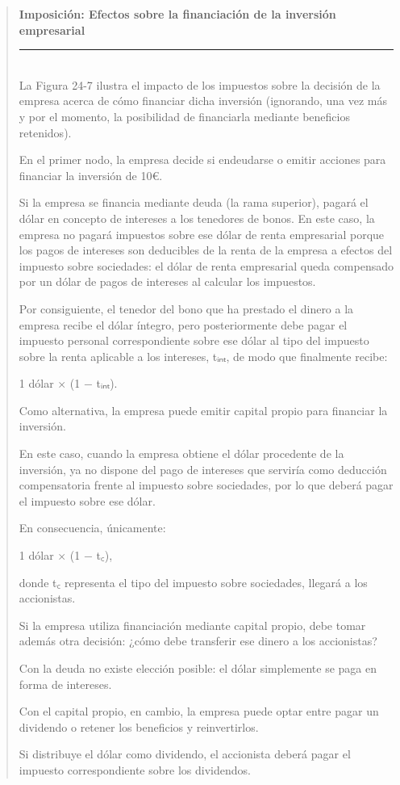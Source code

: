 \documentclass[10pt,a4paper]{article}
\newenvironment{specialblock}[1]{%
      \begin{quote} %
      \small %
      \noindent\textbf{#1}\\[-0.3em] %
      \rule{\linewidth}{0.4pt}\\[0.6em]}{
      \end{quote}}
\begin{document}
\begin{specialblock}{Imposición: Efectos sobre la financiación de la inversión empresarial}
    La Figura 24-7 ilustra el impacto de los impuestos sobre la decisión de la empresa acerca de cómo financiar dicha inversión (ignorando, una vez más y por el momento, la posibilidad de financiarla mediante beneficios retenidos).
    
    En el primer nodo, la empresa decide si endeudarse o emitir acciones para financiar la inversión de 10€.
    
    Si la empresa se financia mediante deuda (la rama superior), pagará el dólar en concepto de intereses a los tenedores de bonos. En este caso, la empresa no pagará impuestos sobre ese dólar de renta empresarial porque los pagos de intereses son deducibles de la renta de la empresa a efectos del impuesto sobre sociedades: el dólar de renta empresarial queda compensado por un dólar de pagos de intereses al calcular los impuestos.
    
    Por consiguiente, el tenedor del bono que ha prestado el dinero a la empresa recibe el dólar íntegro, pero posteriormente debe pagar el impuesto personal correspondiente sobre ese dólar al tipo del impuesto sobre la renta aplicable a los intereses, tᵢₙₜ, de modo que finalmente recibe:
    
    1 dólar × (1 − tᵢₙₜ).
    
    Como alternativa, la empresa puede emitir capital propio para financiar la inversión.
    
    En este caso, cuando la empresa obtiene el dólar procedente de la inversión, ya no dispone del pago de intereses que serviría como deducción compensatoria frente al impuesto sobre sociedades, por lo que deberá pagar el impuesto sobre ese dólar.
    
    En consecuencia, únicamente:
    
    1 dólar × (1 − t꜀),
    
    donde t꜀ representa el tipo del impuesto sobre sociedades, llegará a los accionistas.
    
    Si la empresa utiliza financiación mediante capital propio, debe tomar además otra decisión: ¿cómo debe transferir ese dinero a los accionistas?
    
    Con la deuda no existe elección posible: el dólar simplemente se paga en forma de intereses.
    
    Con el capital propio, en cambio, la empresa puede optar entre pagar un dividendo o retener los beneficios y reinvertirlos.
    
    Si distribuye el dólar como dividendo, el accionista deberá pagar el impuesto correspondiente sobre los dividendos.
    

\end{specialblock}
\end{document}

